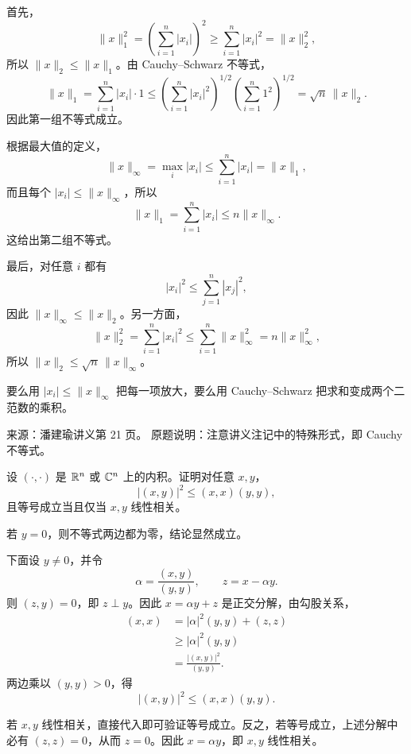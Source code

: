 \begin{solution}
首先，
\[
\|x\|_1^2
=\left(\sum_{i=1}^n|x_i|\right)^2
\ge\sum_{i=1}^n|x_i|^2
=\|x\|_2^2,
\]
所以 $\|x\|_2\le\|x\|_1$。由 Cauchy--Schwarz 不等式，
\[
\|x\|_1
=\sum_{i=1}^n|x_i|\cdot1
\le
\left(\sum_{i=1}^n|x_i|^2\right)^{1/2}
\left(\sum_{i=1}^n1^2\right)^{1/2}
=\sqrt n\,\|x\|_2.
\]
因此第一组不等式成立。

根据最大值的定义，
\[
\|x\|_\infty=\max_i|x_i|
\le\sum_{i=1}^n|x_i|=\|x\|_1,
\]
而且每个 $|x_i|\le\|x\|_\infty$，所以
\[
\|x\|_1=\sum_{i=1}^n|x_i|
\le n\|x\|_\infty.
\]
这给出第二组不等式。

最后，对任意 $i$ 都有
\[
|x_i|^2\le\sum_{j=1}^n|x_j|^2,
\]
因此 $\|x\|_\infty\le\|x\|_2$。另一方面，
\[
\|x\|_2^2
=\sum_{i=1}^n|x_i|^2
\le\sum_{i=1}^n\|x\|_\infty^2
=n\|x\|_\infty^2,
\]
所以 $\|x\|_2\le\sqrt n\,\|x\|_\infty$。
\end{solution}

\begin{dxtips}[范数放缩的两个动作]\label{hw:matrix:tip6}
要么用 $|x_i|\le\|x\|_\infty$ 把每一项放大，要么用 Cauchy--Schwarz 把求和变成两个二范数的乘积。
\end{dxtips}

\begin{homework}
\par\smallskip\textsf{来源：潘建瑜讲义第 21 页。}
原题说明：注意讲义注记中的特殊形式，即 Cauchy 不等式。\par\smallskip

设 $(\cdot,\cdot)$ 是 $\mathbb{R}^n$ 或 $\mathbb{C}^n$ 上的内积。证明对任意 $x,y$，
\[
|(x,y)|^2\le(x,x)(y,y),
\]
且等号成立当且仅当 $x,y$ 线性相关。
\end{homework}

\begin{solution}
若 $y=0$，则不等式两边都为零，结论显然成立。

下面设 $y\ne0$，并令
\[
\alpha=\frac{(x,y)}{(y,y)},
\qquad
z=x-\alpha y.
\]
则 $(z,y)=0$，即 $z\perp y$。因此 $x=\alpha y+z$ 是正交分解，由勾股关系，
\begin{align*}
(x,x)
&=|\alpha|^2(y,y)+(z,z)\\
&\ge |\alpha|^2(y,y)\\
&=\frac{|(x,y)|^2}{(y,y)}.
\end{align*}
两边乘以 $(y,y)>0$，得
\[
|(x,y)|^2\le(x,x)(y,y).
\]

若 $x,y$ 线性相关，直接代入即可验证等号成立。反之，若等号成立，上述分解中必有 $(z,z)=0$，从而 $z=0$。因此 $x=\alpha y$，即 $x,y$ 线性相关。
\end{solution}

